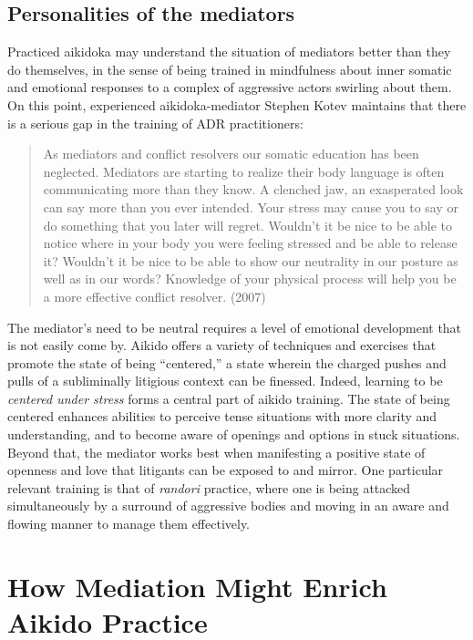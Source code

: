 \subsection*{Personalities of the mediators}

Practiced aikidoka may understand the situation of mediators better than they do themselves, in the sense of being trained in mindfulness about inner somatic and emotional responses to a complex of aggressive actors swirling about them. On this point, experienced aikidoka-mediator Stephen Kotev maintains that there is a serious gap in the training of ADR practitioners:

\begin{quote}
As mediators and conflict resolvers our somatic education has been neglected. Mediators are starting to realize their body language is often communicating more than they know. A clenched jaw, an exasperated look can say more than you ever intended. Your stress may cause you to say or do something that you later will regret. Wouldn't it be nice to be able to notice where in your body you were feeling stressed and be able to release it? Wouldn't it be nice to be able to show our neutrality in our posture as well as in our words? Knowledge of your physical process will help you be a more effective conflict resolver. (2007)
\end{quote}

The mediator's need to be neutral requires a level of emotional development that is not easily come by. Aikido offers a variety of techniques and exercises that promote the state of being ``centered,'' a state wherein the charged pushes and pulls of a subliminally litigious context can be finessed. Indeed, learning to be \emph{centered under stress} forms a central part of aikido training. The state of being centered enhances abilities to perceive tense situations with more clarity and understanding, and to become aware of openings and options in stuck situations. Beyond that, the mediator works best when manifesting a positive state of openness and love that litigants can be exposed to and mirror. One particular relevant training is that of \emph{randori} practice, where one is being attacked simultaneously by a surround of aggressive bodies and moving in an aware and flowing manner to manage them effectively. 

\section*{How Mediation Might Enrich Aikido Practice}

